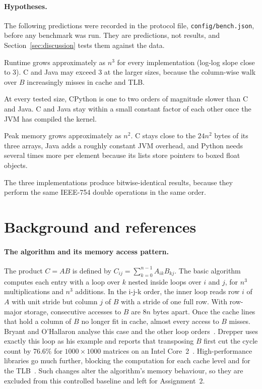 \documentclass[11pt,a4paper]{article}
\begin{document}
\paragraph{Hypotheses.} The following predictions were recorded in the
protocol file, \texttt{config/bench.json}, before any benchmark was run. They are
predictions, not results, and Section~\ref{sec:discussion} tests them against the
data.
\begin{description}[leftmargin=2.2em,style=sameline]
  \item[H1] Runtime grows approximately as $n^3$ for every implementation
  (log-log slope close to 3). C and Java may exceed 3 at the larger sizes,
  because the column-wise walk over $B$ increasingly misses in cache and TLB.
  \item[H2] At every tested size, CPython is one to two orders of magnitude
  slower than C and Java. C and Java stay within a small constant factor of
  each other once the JVM has compiled the kernel.
  \item[H3] Peak memory grows approximately as $n^2$. C stays close to the
  $24n^2$ bytes of its three arrays, Java adds a roughly constant JVM overhead,
  and Python needs several times more per element because its lists store
  pointers to boxed float objects.
  \item[H4] The three implementations produce bitwise-identical results,
  because they perform the same IEEE-754 double operations in the same order.
\end{description}

\section{Background and references}
\label{sec:background}

\paragraph{The algorithm and its memory access pattern.} The product
$C=AB$ is defined by $C_{ij}=\sum_{k=0}^{n-1}A_{ik}B_{kj}$. The basic
algorithm computes each entry with a loop over $k$ nested inside loops over $i$
and $j$, for $n^3$ multiplications and $n^3$ additions. In the i-j-k order, the
inner loop reads row $i$ of $A$ with unit stride but column $j$ of $B$ with a
stride of one full row. With row-major storage, consecutive accesses to $B$ are
$8n$ bytes apart. Once the cache lines that hold a column of $B$ no longer fit in
cache, almost every access to $B$ misses. Bryant and O'Hallaron analyse this case
and the other loop orders~\cite{bryant2016}. Drepper uses exactly this loop as
his example and reports that transposing $B$ first cut the cycle count by 76.6\%
for $1000\times1000$ matrices on an Intel Core~2~\cite{drepper2007}.
High-performance libraries go much further, blocking the computation for each
cache level and for the TLB~\cite{goto2008}. Such changes alter the
algorithm's memory behaviour, so they are excluded from this controlled baseline
and left for Assignment~2.
\end{document}
